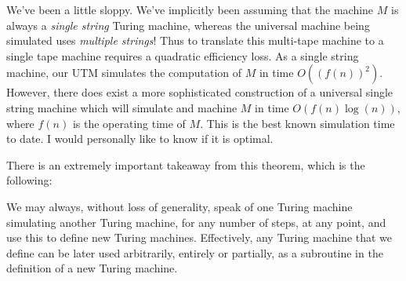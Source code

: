We've been a little sloppy. We've implicitly been assuming that the machine $M$ is always a \textit{single string} Turing machine, whereas the universal machine being simulated uses \textit{multiple strings}! Thus to translate this multi-tape machine to a single tape machine requires a quadratic efficiency loss. As a single string machine, our UTM simulates the computation of $M$ in time $O((f(n))^2)$. However, there does exist a more sophisticated construction of a universal single string machine which will simulate and machine $M$ in time $O(f(n)\log(n))$, where $f(n)$ is the operating time of $M$. This is the best known simulation time to date. I would personally like to know if it is optimal. 

There is an extremely important takeaway from this theorem, which is the following:
\begin{center}
    We may always, without loss of generality, speak of one Turing machine simulating another Turing machine, for any number of steps, at any point, and use this to define new Turing machines. Effectively, any Turing machine that we define can be later used arbitrarily, entirely or partially, as a subroutine in the definition of a new Turing machine.
\end{center}

